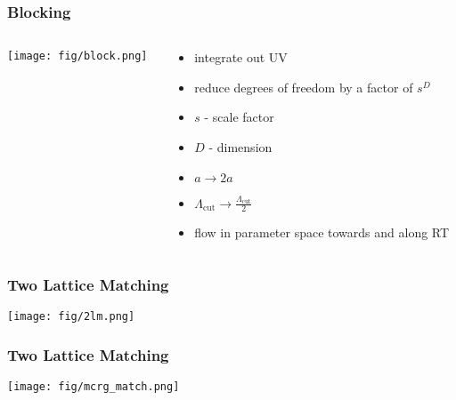 \documentclass{beamer}
\begin{document}
  \begin{frame}
    \frametitle{Blocking}
    \begin{columns}[T]
      \begin{column}{.5\textwidth}
        \begin{block}{}
          \texttt{[image: fig/block.png]}
        \end{block}
      \end{column}
      \begin{column}{.5\textwidth}
        \begin{block}{}
          \begin{itemize}
            \item integrate out UV
            \item reduce degrees of freedom by a factor of $s^D$
            \item $s$ - scale factor
            \item $D$ - dimension
            \item $a \rightarrow 2a$
            \item $\Lambda_{\text{cut}} \rightarrow \tfrac{\Lambda_{\text{cut}}}{2}$
            \item flow in parameter space towards and along RT
          \end{itemize}
        \end{block}
      \end{column}
    \end{columns}
  \end{frame}

  \begin{frame}
    \frametitle{Two Lattice Matching}
    \centering
    \texttt{[image: fig/2lm.png]}
  \end{frame}

  \begin{frame}
    \frametitle{Two Lattice Matching}
    \centering
    \texttt{[image: fig/mcrg\_match.png]}
  \end{frame}
\end{document}
